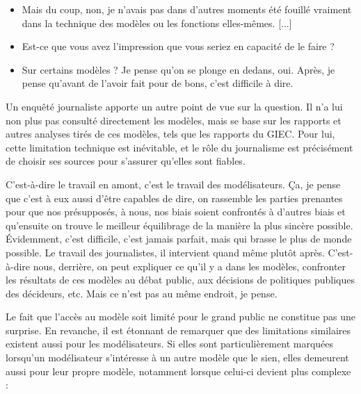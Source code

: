 \begin{authoredquote}

\begin{minipage}{\textwidth}
    \begin{itemize}
        \item Mais du coup, non, je n'avais pas dans d'autres moments été fouillé vraiment dans la technique des modèles ou les fonctions elles-mêmes. [...]
        \item Est-ce que vous avez l'impression que vous seriez en capacité de le faire ?
        \item Sur certains modèles ? Je pense qu'on se plonge en dedans, oui. Après, je pense qu'avant de l'avoir fait pour de bons, c'est difficile à dire.
    \end{itemize}
\end{minipage}
\end{authoredquote}


Un enquêté journaliste apporte un autre point de vue sur la question. Il n'a lui non plus pas consulté directement les modèles, mais se base sur les rapports et autres analyses tirés de ces modèles, tels que les rapports du GIEC. Pour lui, cette limitation technique est inévitable, et le rôle du journalisme est précisément de choisir ses sources pour s'assurer qu'elles sont fiables. 

\begin{authoredquote}
    C'est-à-dire le travail en amont, c'est le travail des modélisateurs. Ça, je pense que c'est à eux aussi d'être capables de dire, on rassemble les parties prenantes pour que nos présupposés, à nous, nos biais soient confrontés à d'autres biais et qu'ensuite on trouve le meilleur équilibrage de la manière la plus sincère possible. Évidemment, c'est difficile, c'est jamais parfait, mais qui brasse le plus de monde possible. Le travail des journalistes, il intervient quand même plutôt après. C'est-à-dire nous, derrière, on peut expliquer ce qu'il y a dans les modèles, confronter les résultats de ces modèles au débat public, aux décisions de politiques publiques des décideurs, etc. Mais ce n'est pas au même endroit, je pense.
\end{authoredquote}


Le fait que l'accès au modèle soit limité pour le grand public ne constitue pas une surprise. En revanche, il est étonnant de remarquer que des limitations similaires existent  aussi pour les modélisateurs. Si elles sont particulièrement marquées lorsqu'un modélisateur s'intéresse à un autre modèle que le sien, elles demeurent aussi pour leur propre modèle, notamment lorsque celui-ci devient plus complexe : 


